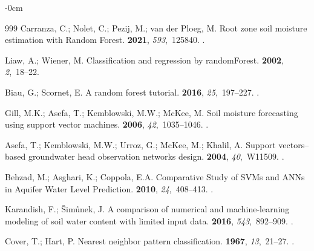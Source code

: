 \documentclass[land,review,accept,pdftex,oneauthor]{Definitions/mdpi}
\begin{document}
\begin{adjustwidth}{-\extralength}{0cm}
\begin{thebibliography}{999}
Carranza, C.; Nolet, C.; Pezij, M.; {van der Ploeg}, M.
\newblock Root zone soil moisture estimation with Random Forest.
 {\bf 2021}, {\em 593},~125840.
.

Liaw, A.; Wiener, M.
\newblock Classification and regression by randomForest.
 {\bf 2002}, {\em 2},~18--22.

Biau, G.; Scornet, E.
\newblock A random forest tutorial.
 {\bf 2016}, {\em 25},~197--227.
.

Gill, M.K.; Asefa, T.; Kemblowski, M.W.; McKee, M.
\newblock Soil moisture forecasting using support vector machines.
 {\bf 2006},
  {\em 42},~1035--1046.
.

Asefa, T.; Kemblowski, M.W.; Urroz, G.; McKee, M.; Khalil, A.
\newblock Support vectors–based groundwater head observation networks design.
 {\bf 2004}, {\em 40},~W11509.
.

Behzad, M.; Asghari, K.; Coppola, E.A.
\newblock Comparative Study of SVMs and ANNs in Aquifer Water Level Prediction.
 {\bf 2010}, {\em
  24},~408--413.
.

Karandish, F.; Šimůnek, J.
\newblock A comparison of numerical and machine-learning modeling of soil water
  content with limited input data.
 {\bf 2016}, {\em 543},~892–909.
.

Cover, T.; Hart, P.
\newblock Nearest neighbor pattern classification.
 {\bf 1967}, {\em
  13},~21--27.
.


\end{thebibliography}
\end{adjustwidth}
\end{document}
